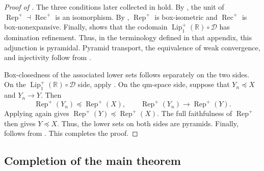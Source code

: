 \documentclass{amsart}
\theoremstyle{plain}
\theoremstyle{definition}
\theoremstyle{remark}
\newcommand{\R}{\mathbb{R}}
\newcommand{\D}{\mathcal{D}}
\newcommand{\Lup}{\operatorname{Lip}^{+}_{1}(\R)}
\begin{document}
\begin{proof}[Proof of ]
The three conditions later collected in  hold. By , the unit of $\operatorname{Rep}^{+}\dashv\operatorname{Rec}^{+}$ is an isomorphism. By , $\operatorname{Rep}^{+}$ is box-isometric and $\operatorname{Rec}^{+}$ is box-nonexpansive. Finally, \cite[Lemma~5.4]{gds2} shows that the codomain $\Lup\circ\D$ has domination refinement. Thus, in the terminology defined in that appendix, this adjunction is pyramidal. Pyramid transport, the equivalence of weak convergence, and injectivity follow from .

Box-closedness of the associated lower sets follows separately on the two sides. On the $\Lup\circ\D$ side, apply . On the qm-space side, suppose that $Y_n\preceq X$ and $Y_n\to Y$. Then
\[
\operatorname{Rep}^{+}(Y_n)\preceq\operatorname{Rep}^{+}(X),\qquad
\operatorname{Rep}^{+}(Y_n)\longrightarrow\operatorname{Rep}^{+}(Y).
\]
Applying  again gives $\operatorname{Rep}^{+}(Y)\preceq\operatorname{Rep}^{+}(X)$. The full faithfulness of $\operatorname{Rep}^{+}$ then gives $Y\preceq X$. Thus, the lower sets on both sides are pyramids. Finally,  follows from .
This completes the proof.
\end{proof}

\subsection{Completion of the main theorem}
\end{document}
